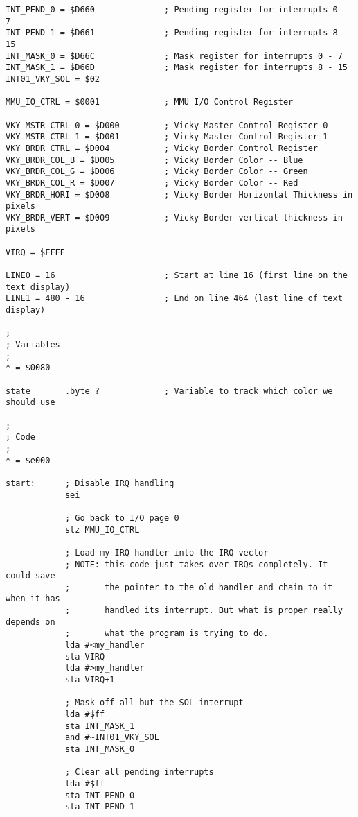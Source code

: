\begin{verbatim}
INT_PEND_0 = $D660              ; Pending register for interrupts 0 - 7
INT_PEND_1 = $D661              ; Pending register for interrupts 8 - 15
INT_MASK_0 = $D66C  			; Mask register for interrupts 0 - 7
INT_MASK_1 = $D66D  			; Mask register for interrupts 8 - 15
INT01_VKY_SOL = $02

MMU_IO_CTRL = $0001             ; MMU I/O Control Register

VKY_MSTR_CTRL_0 = $D000         ; Vicky Master Control Register 0
VKY_MSTR_CTRL_1 = $D001         ; Vicky Master Control Register 1
VKY_BRDR_CTRL = $D004           ; Vicky Border Control Register
VKY_BRDR_COL_B = $D005          ; Vicky Border Color -- Blue
VKY_BRDR_COL_G = $D006          ; Vicky Border Color -- Green
VKY_BRDR_COL_R = $D007          ; Vicky Border Color -- Red
VKY_BRDR_HORI = $D008           ; Vicky Border Horizontal Thickness in pixels
VKY_BRDR_VERT = $D009           ; Vicky Border vertical thickness in pixels

VIRQ = $FFFE

LINE0 = 16                      ; Start at line 16 (first line on the text display)
LINE1 = 480 - 16                ; End on line 464 (last line of text display)

;
; Variables
;
* = $0080

state       .byte ?             ; Variable to track which color we should use

;
; Code
;
* = $e000

start:      ; Disable IRQ handling
            sei

            ; Go back to I/O page 0
            stz MMU_IO_CTRL

            ; Load my IRQ handler into the IRQ vector
            ; NOTE: this code just takes over IRQs completely. It could save
            ;       the pointer to the old handler and chain to it when it has
            ;       handled its interrupt. But what is proper really depends on
            ;       what the program is trying to do.
            lda #<my_handler
            sta VIRQ
            lda #>my_handler
            sta VIRQ+1

            ; Mask off all but the SOL interrupt
            lda #$ff
            sta INT_MASK_1
            and #~INT01_VKY_SOL
            sta INT_MASK_0

            ; Clear all pending interrupts
            lda #$ff
            sta INT_PEND_0
            sta INT_PEND_1


\end{verbatim}
